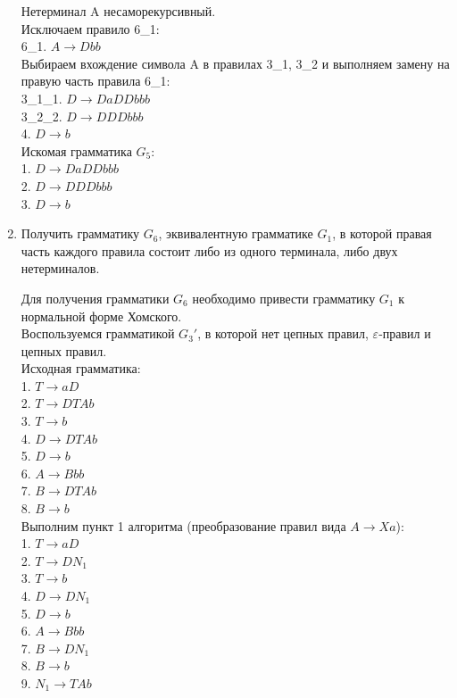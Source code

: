\documentclass[a4paper,14pt]{extarticle}
\begin{document}
\begin{enumerate}[1.]
Нетерминал A несаморекурсивный.\\
Исключаем правило 6\_1:\\
6\_1. $A \rightarrow Dbb$\\
Выбираем вхождение символа A в правилах 3\_1, 3\_2 и
выполняем замену на правую часть правила 6\_1:\\
3\_1\_1. $D \rightarrow DaDDbbb$\\
3\_2\_2. $D \rightarrow DDDbbb$\\
4. $D \rightarrow b$\\

Искомая грамматика $G_5$:\\
1. $D \rightarrow DaDDbbb$\\
2. $D \rightarrow DDDbbb$\\
3. $D \rightarrow b$\\

\item Получить грамматику $G_6$, эквивалентную грамматике $G_1$, в которой
правая часть каждого правила состоит либо из одного терминала, либо двух нетерминалов.

Для получения грамматики $G_6$ необходимо привести грамматику $G_1$ 
к нормальной форме Хомского.\\
Воспользуемся грамматикой $G_3'$, в которой нет цепных правил, $\varepsilon$-правил
и цепных правил.\\
Исходная грамматика:\\
1. $T \rightarrow aD$\\
2. $T \rightarrow DTAb$\\
3. $T \rightarrow b$\\
4. $D \rightarrow DTAb$\\
5. $D \rightarrow b$\\
6. $A \rightarrow Bbb$\\
7. $B \rightarrow DTAb$\\
8. $B \rightarrow b$\\

Выполним пункт 1 алгоритма (преобразование правил вида $A \rightarrow Xa$):\\
1. $T \rightarrow aD$\\
2. $T \rightarrow DN_1$\\
3. $T \rightarrow b$\\
4. $D \rightarrow DN_1$\\
5. $D \rightarrow b$\\
6. $A \rightarrow Bbb$\\
7. $B \rightarrow DN_1$\\
8. $B \rightarrow b$\\
9. $N_1 \rightarrow TAb$\\


\end{enumerate}
\end{document}
